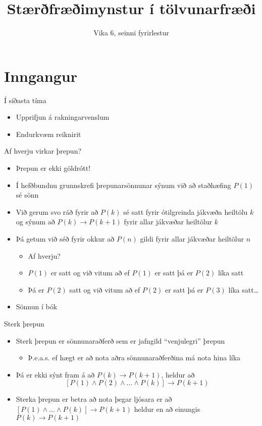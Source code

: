 \documentclass{beamer}
\title{Stærðfræðimynstur í tölvunarfræði}
\subtitle{Vika 6, seinni fyrirlestur}
\begin{document}
\begin{frame}
\titlepage
\end{frame}


\section{Inngangur}

\begin{frame}{Í síðasta tíma}
\begin{itemize}
 \item Upprifjun á rakningarvenslum
 \item Endurkvæm reiknirit
\end{itemize}
\end{frame}

\begin{frame}{Af hverju virkar þrepun?}
\begin{itemize}
 \item Þrepun er ekki göldrótt!
 \item Í hefðbundnu grunnskrefi þrepunarsönnunar sýnum við að staðhæfing $P(1)$ sé sönn
 \item Við gerum svo ráð fyrir að $P(k)$ sé satt fyrir ótilgreinda jákvæða heiltölu $k$ og sýnum að $P(k) \to P(k+1)$ fyrir allar jákvæðar heiltölur $k$
 \item Þá getum við séð fyrir okkur að $P(n)$ gildi fyrir allar jákvæðar heiltölur $n$
 \begin{itemize}
  \item Af hverju?
  \item $P(1)$ er satt og við vitum að ef $P(1)$ er satt þá er $P(2)$ líka satt
  \item Þá er $P(2)$ satt og við vitum að ef $P(2)$ er satt þá er $P(3)$ líka satt\ldots
 \end{itemize}
 \item Sönnun í bók
\end{itemize}
\end{frame}

\begin{frame}{Sterk þrepun}
\begin{itemize}
 \item Sterk þrepun er sönnunaraðferð sem er jafngild ``venjulegri'' þrepun
 \begin{itemize}
  \item Þ.e.a.s. ef hægt er að nota aðra sönnunaraðferðina má nota hina líka
 \end{itemize}
 \item Þá er ekki sýnt fram á að $P(k) \to P(k+1)$, heldur að \[[P(1) \land P(2) \land \ldots \land P(k)] \to P(k+1)\]
 \item Sterka þrepun er betra að nota þegar ljósara er að $[P(1) \land \ldots \land P(k)] \to P(k+1)$ heldur en að einungis $P(k) \to P(k+1)$
\end{itemize}
\end{frame}
\end{document}
